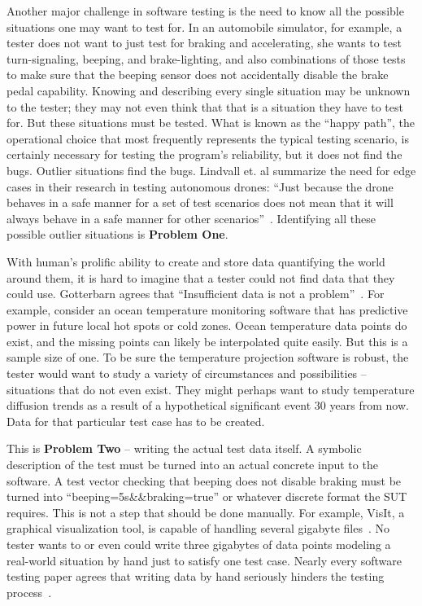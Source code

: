 Another major challenge in software testing is the need to know all the possible situations one may want to test for. In an automobile simulator, for example, a tester does not want to just test for braking and accelerating, she wants to test turn-signaling, beeping, and brake-lighting, and also combinations of those tests to make sure that the beeping sensor does not accidentally disable the brake pedal capability. Knowing and describing every single situation may be unknown to the tester; they may not even think that that is a situation they have to test for. But these situations must be tested. What is known as the ``happy path'', the operational choice that most frequently represents the typical testing scenario, is certainly necessary for testing the program’s reliability, but it does not find the bugs. Outlier situations find the bugs. Lindvall et. al summarize the need for edge cases in their research in testing autonomous drones: ``Just because the drone behaves in a safe manner for a set of test scenarios does not mean that it will always behave in a safe manner for other scenarios''~\cite{Lindvall:2017:MMT:3103620.3103632}. Identifying all these possible outlier situations is \textbf{Problem One}.

With human's prolific ability to create and store data quantifying the world around them, it is hard to imagine that a tester could not find data that they could use. Gotterbarn agrees that ``Insufficient data is not a problem''~\cite{Gotterbarn:2016:CFC:2874239.2874248}. For example, consider an ocean temperature monitoring software that has predictive power in future local hot spots or cold zones. Ocean temperature data points do exist, and the missing points can likely be interpolated quite easily. But this is a sample size of one. To be sure the temperature projection software is robust, the tester would want to study a variety of circumstances and possibilities – situations that do not even exist. They might perhaps want to study temperature diffusion trends as a result of a hypothetical significant event 30 years from now. Data for that particular test case has to be created.

This is \textbf{Problem Two} -- writing the actual test data itself. A symbolic description of the test must be turned into an actual concrete input to the software. A test vector checking that beeping does not disable braking must be turned into ``beeping=5s\&\&braking=true'' or whatever discrete format the SUT requires. This is not a step that should be done manually. For example, VisIt, a graphical visualization tool, is capable of handling several gigabyte files~\cite{VisIt}. No tester wants to or even could write three gigabytes of data points modeling a real-world situation by hand just to satisfy one test case. Nearly every software testing paper agrees that writing data by hand seriously hinders the testing process~\cite{Misailovic:2007:PTG:1287624.1287645,Murphy:2007:PRT:1292414.1292425,Palka:2011:TOC:1982595.1982615,Patrick:2016:ATI:2970276.2970333}.


